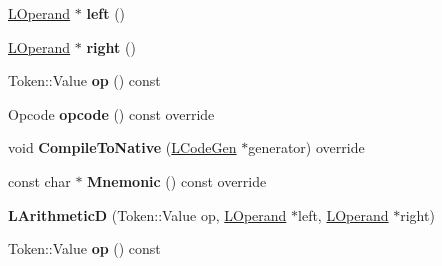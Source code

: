 \begin{DoxyCompactItemize}
\item 
\hyperlink{classv8_1_1internal_1_1_l_operand}{L\+Operand} $\ast$ {\bfseries left} ()\hypertarget{classv8_1_1internal_1_1_l_arithmetic_d_a8d143eb5deb9725b2544b7ecc1a6b7aa}{}\label{classv8_1_1internal_1_1_l_arithmetic_d_a8d143eb5deb9725b2544b7ecc1a6b7aa}

\item 
\hyperlink{classv8_1_1internal_1_1_l_operand}{L\+Operand} $\ast$ {\bfseries right} ()\hypertarget{classv8_1_1internal_1_1_l_arithmetic_d_ad78701fa7af5138fc5a741a1ceed96a7}{}\label{classv8_1_1internal_1_1_l_arithmetic_d_ad78701fa7af5138fc5a741a1ceed96a7}

\item 
Token\+::\+Value {\bfseries op} () const \hypertarget{classv8_1_1internal_1_1_l_arithmetic_d_a0689ba0a4deee0bb4450bb0fdc7f877b}{}\label{classv8_1_1internal_1_1_l_arithmetic_d_a0689ba0a4deee0bb4450bb0fdc7f877b}

\item 
Opcode {\bfseries opcode} () const  override\hypertarget{classv8_1_1internal_1_1_l_arithmetic_d_a6371d86c37944a1a90b2e4778d0b7024}{}\label{classv8_1_1internal_1_1_l_arithmetic_d_a6371d86c37944a1a90b2e4778d0b7024}

\item 
void {\bfseries Compile\+To\+Native} (\hyperlink{classv8_1_1internal_1_1_l_code_gen}{L\+Code\+Gen} $\ast$generator) override\hypertarget{classv8_1_1internal_1_1_l_arithmetic_d_a87834ef9f5e37f8ade4c8e8ef4284572}{}\label{classv8_1_1internal_1_1_l_arithmetic_d_a87834ef9f5e37f8ade4c8e8ef4284572}

\item 
const char $\ast$ {\bfseries Mnemonic} () const  override\hypertarget{classv8_1_1internal_1_1_l_arithmetic_d_a401c29ddc6c8aa2dc41d23d4be14aff7}{}\label{classv8_1_1internal_1_1_l_arithmetic_d_a401c29ddc6c8aa2dc41d23d4be14aff7}

\item 
{\bfseries L\+ArithmeticD} (Token\+::\+Value op, \hyperlink{classv8_1_1internal_1_1_l_operand}{L\+Operand} $\ast$left, \hyperlink{classv8_1_1internal_1_1_l_operand}{L\+Operand} $\ast$right)\hypertarget{classv8_1_1internal_1_1_l_arithmetic_d_aad5c45947dcad72abbbcd55b081f4e6e}{}\label{classv8_1_1internal_1_1_l_arithmetic_d_aad5c45947dcad72abbbcd55b081f4e6e}

\item 
Token\+::\+Value {\bfseries op} () const \hypertarget{classv8_1_1internal_1_1_l_arithmetic_d_a0689ba0a4deee0bb4450bb0fdc7f877b}{}\label{classv8_1_1internal_1_1_l_arithmetic_d_a0689ba0a4deee0bb4450bb0fdc7f877b}


\end{DoxyCompactItemize}
